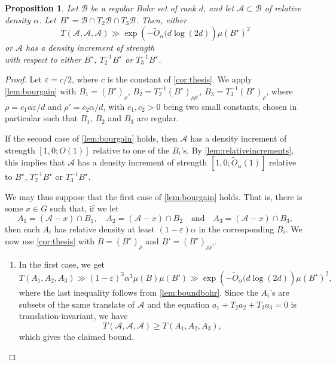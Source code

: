 \documentclass{daj}
\newtheorem{proposition}[theorem]{Proposition}
\theoremstyle{definition}
\newcommand{\eps}{\varepsilon}
\newcommand{\A}{\ensuremath{\mathcal{A}}}
\newcommand{\B}{\ensuremath{\mathcal{B}}}
\begin{document}
\begin{proposition}
\label{prop:weakerincrement}
Let $\B$ be a regular Bohr set of rank $d$, and let $\A \subset \B$ of relative density $\alpha$. Let~$B^{\star} = {\B \cap T_2\B \cap T_3\B}$. Then, either 
\begin{equation*}
T(\A, \A, \A) \gg \exp \left(-\tilde{O}_{\alpha}(d \log(2d)\right) \mu(B^{\star})^2
\end{equation*}
or $\A$ has a density increment of strength
\begin{equation*}
[1, \alpha^{-1}; \tilde{O}_{\alpha}(1)]
\end{equation*}
with respect to either $B^{\star}$, $T_2^{-1}B^{\star}$ or $T_3^{-1}B^{\star}$.
\end{proposition}

\begin{proof}
Let $\eps = c/2$, where $c$ is the constant of \cref{cor:thesis}. We apply \cref{lem:bourgain} with $B_1 = (B^{\star})_{\rho}$, $B_2 = T_2^{-1}(B^{\star})_{\rho\rho'}$, $B_3 = T_3^{-1}(B^{\star})_{\rho}$, where $\rho = c_1\alpha \eps/d$ and $\rho' = c_2\alpha/d$, with $c_1, c_2>0$ being two small constants, chosen in particular such that $B_1$, $B_2$ and $B_3$ are regular.

If the second case of \cref{lem:bourgain} holds, then $\A$ has a density increment of strength $[1, 0; O(1)]$ relative to one of the $B_i$'s. By \cref{lem:relativeincrements}, this implies that $\A$ has a density increment of strength $[1, 0; \tilde{O}_{\alpha}(1)]$ relative to $B^{\star}$, $T_2^{-1}B^{\star}$ or $T_3^{-1}B^{\star}$.

We may thus suppose that the first case of \cref{lem:bourgain} holds. That is, there is some $x\in G$ such that, if we let 
\begin{equation*}
A_1 = (\A - x) \cap B_1, \quad A_2 = (\A - x) \cap B_2\quad \text{and}\quad A_3 = (\A - x) \cap B_3,
\end{equation*}
then each $A_i$ has relative density at least $(1-\eps) \alpha$ in the corresponding $B_i$. We now use \cref{cor:thesis} with $B = (B^{\star})_{\rho}$ and $B' = (B^{\star})_{\rho\rho'}$. 

\begin{enumerate}
	\item In the first case, we get
        \begin{equation*}
        T(A_1, A_2, A_3) \gg (1-\eps)^3\alpha^3 \mu(B)  \mu(B') \gg \exp \left(-\tilde{O}_{\alpha}(d \log(2d)\right) \mu(B^{\star})^2,
        \end{equation*}
        where the last inequality follows from \cref{lem:boundbohr}. Since the $A_i$'s are subsets of the same translate of $\A$ and the equation $a_1+T_2a_2+T_3a_3 = 0$ is translation-invariant, we have 
        \begin{equation*}
        {T(\A, \A, \A) \geq T(A_1, A_2, A_3)},
        \end{equation*}
        which gives the claimed bound. 


\end{enumerate}
\end{proof}
\end{document}
